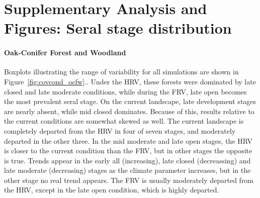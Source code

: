 \appendix

\section{Supplementary Analysis and Figures: Seral stage distribution}
\label{app:futurecovcond}

\paragraph{Oak-Conifer Forest and Woodland} 
Boxplots illustrating the range of variability for all simulations are shown in Figure~\ref{fig:covcond_ocfw}.. Under the HRV, these forests were dominated by late closed and late moderate conditions, while during the FRV, late open becomes the most prevalent seral stage. On the current landscape, late development stages are nearly absent, while mid closed dominates. Because of this, results relative to the current conditions are somewhat skewed as well. The current landscape is completely departed from the HRV in four of seven stages, and moderately departed in the other three. In the mid moderate and late open stages, the HRV is closer to the current condition than the FRV, but in other stages the opposite is true. Trends appear in the early all (increasing), late closed (decreassing) and late moderate (decreasing) stages as the climate parameter increases, but in the other stage no real trend appears. The FRV is usually moderately departed from the HRV, except in the late open condition, which is highly departed.


